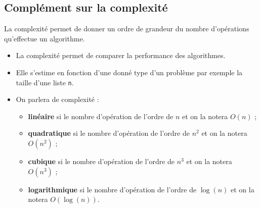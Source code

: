 \subsection{Complément sur la complexité}

\begin{definition2}
La complexité permet de donner un ordre de grandeur du nombre d'opérations qu'effectue un algorithme.
\begin{itemize}
\item La complexité permet de comparer la performance des algorithmes.
\item Elle s'estime en fonction d'une donné type d'un problème par exemple la taille d'une liste \texttt{n}.
\item On parlera de complexité : 
\begin{itemize}
\item \textbf{linéaire} si le nombre d'opération de l'ordre de $n$ et on la notera $O(n)$ ;
\item \textbf{quadratique} si le nombre d'opération de l'ordre de $n^2$ et on la notera $O(n^2)$ ;
\item \textbf{cubique} si le nombre d'opération de l'ordre de $n^3$ et on la notera $O(n^3)$ ;
\item \textbf{logarithmique} si le nombre d'opération de l'ordre de $\log(n)$ et on la notera $O(\log(n))$.
\end{itemize}
\end{itemize}
\end{definition2}

